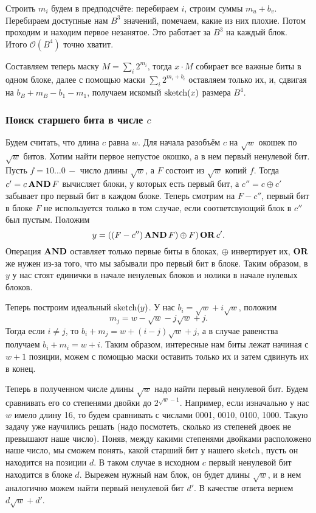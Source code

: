 Строить $m_i$ будем в предподсчёте: перебираем $i$, строим суммы $m_u + b_v$. Перебираем доступные нам $B^3$ значений, помечаем, какие из них плохие. Потом проходим и находим первое незанятое. Это работает за $B^3$ на каждый блок. Итого $\mathcal{O}(B^4)$ точно хватит.

Составляем теперь маску $M = \sum_i 2^{m_i}$, тогда $x\cdot M$ собирает все важные биты в одном блоке, далее с помощью маски $\sum_i 2^{m_i + b_i}$ оставляем только их, и, сдвигая на $b_B+m_B-b_1-m_1$, получаем искомый $\operatorname{sketch}(x)$ размера $B^4$.

\subsubsection{Поиск старшего бита в числе $c$}
Будем считать, что длина $c$ равна $w$.
Для начала разобъём $c$ на $\sqrt{w}$ окошек по $\sqrt{w}$ битов. Хотим найти первое непустое окошко, а в нем первый ненулевой бит. Пусть $f = 10\ldots0 \, -$ число длины $\sqrt{w}$, а $F$ состоит из $\sqrt{w}$ копий $f$. Тогда $c' = c \operatorname{\mathbf{AND}} F$ вычисляет блоки, у которых есть первый бит, а $c'' = c \oplus c'$ забывает про первый бит в каждом блоке. Теперь смотрим на $F - c''$, первый бит в блоке $F$ не используется только в том случае, если соответсвующий блок в $c''$ был пустым. Положим \[ y = ((F - c'') \operatorname{\mathbf{AND}} F) \oplus F) \operatorname{\mathbf{OR}} c'. \] Операция $\operatorname{\mathbf{AND}}$ оставляет только первые биты в блоках, $\oplus$ инвертирует их, $\operatorname{\mathbf{OR}}$ же нужен из-за того, что мы забывали про первый бит в блоке. Таким образом, в $y$ у нас стоят единички в начале ненулевых блоков и нолики в начале нулевых блоков.

Теперь построим идеальный $\operatorname{sketch}(y)$. У нас $b_i = \sqrt{w} + i\sqrt{w}$, положим \[ m_j = w - \sqrt{w} - j\sqrt{w} + j. \] Тогда если $i \neq j$, то $b_i + m_j = w + (i-j)\sqrt{w} + j$, а в случае равенства получаем $b_i + m_i = w + i$. Таким образом, интересные нам биты лежат начиная с $w+1$ позиции, можем с помощью маски оставить только их и затем сдвинуть их в конец.

Теперь в полученном числе длины $\sqrt{w}$ надо найти первый ненулевой бит. Будем сравнивать его со степенями двойки до $2^{\sqrt{w}-1}$. Например, если изначально у нас $w$ имело длину 16, то будем сравнивать с числами 0001, 0010, 0100, 1000. Такую задачу уже научились решать (надо посмотеть, сколько из степеней двоек не превышают наше число). Поняв, между какими степенями двойками расположено наше число, мы сможем понять, какой старший бит у нашего $\operatorname{sketch}$, пусть он находится на позиции $d$. В таком случае в исходном $c$ первый ненулевой бит находится в блоке $d$. Вырежем нужный нам блок, он будет длины $\sqrt{w}$, и в нем аналогично можем найти первый ненулевой бит $d'$. В качестве ответа вернем $d\sqrt{w} + d'$.

